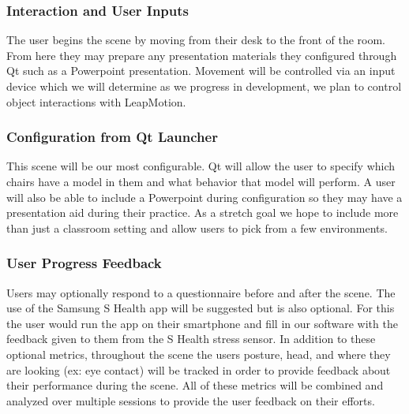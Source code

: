 \documentclass[a4paper,10pt]{article}
\begin{document}
\subsubsection{Interaction and User Inputs}
The user begins the scene by moving from their desk to the front of the room. From here they may prepare any presentation materials they configured through Qt such as a Powerpoint presentation. Movement will be controlled via an input device which we will determine as we progress in development, we plan to control object interactions with LeapMotion. 

\subsubsection{Configuration from Qt Launcher}
This scene will be our most configurable. Qt will allow the user to specify which chairs have a model in them and what behavior that model will perform. A user will also be able to include a Powerpoint during configuration so they may have a presentation aid during their practice. As a stretch goal we hope to include more than just a classroom setting and allow users to pick from a few environments.

\subsubsection{User Progress Feedback}
Users may optionally respond to a questionnaire before and after the scene. The use of the Samsung S Health app will be suggested but is also optional. For this the user would run the app on their smartphone and fill in our software with the feedback given to them from the S Health stress sensor. In addition to these optional metrics, throughout the scene the users posture, head, and where they are looking (ex: eye contact) will be tracked in order to provide feedback about their performance during the scene. All of these metrics will be combined and analyzed over multiple sessions to provide the user feedback on their efforts. %
\end{document}
